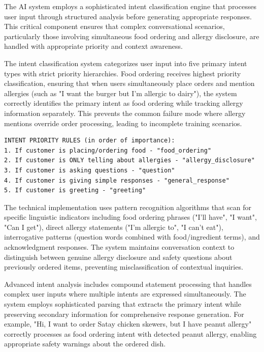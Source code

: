 \documentclass[MScCS]{uccthesis}
\begin{document}
The AI system employs a sophisticated intent classification engine that processes user input through structured analysis before generating appropriate responses. This critical component ensures that complex conversational scenarios, particularly those involving simultaneous food ordering and allergy disclosure, are handled with appropriate priority and context awareness.

The intent classification system categorizes user input into five primary intent types with strict priority hierarchies. Food ordering receives highest priority classification, ensuring that when users simultaneously place orders and mention allergies (such as "I want the burger but I'm allergic to dairy"), the system correctly identifies the primary intent as food ordering while tracking allergy information separately. This prevents the common failure mode where allergy mentions override order processing, leading to incomplete training scenarios.

\begin{verbatim}
INTENT PRIORITY RULES (in order of importance):
1. If customer is placing/ordering food - "food_ordering" 
2. If customer is ONLY telling about allergies - "allergy_disclosure"
3. If customer is asking questions - "question"
4. If customer is giving simple responses - "general_response"
5. If customer is greeting - "greeting"
\end{verbatim}

The technical implementation uses pattern recognition algorithms that scan for specific linguistic indicators including food ordering phrases ("I'll have", "I want", "Can I get"), direct allergy statements ("I'm allergic to", "I can't eat"), interrogative patterns (question words combined with food/ingredient terms), and acknowledgment responses. The system maintains conversation context to distinguish between genuine allergy disclosure and safety questions about previously ordered items, preventing misclassification of contextual inquiries.

Advanced intent analysis includes compound statement processing that handles complex user inputs where multiple intents are expressed simultaneously. The system employs sophisticated parsing that extracts the primary intent while preserving secondary information for comprehensive response generation. For example, "Hi, I want to order Satay chicken skewers, but I have peanut allergy" correctly processes as food ordering intent with detected peanut allergy, enabling appropriate safety warnings about the ordered dish.
\end{document}
